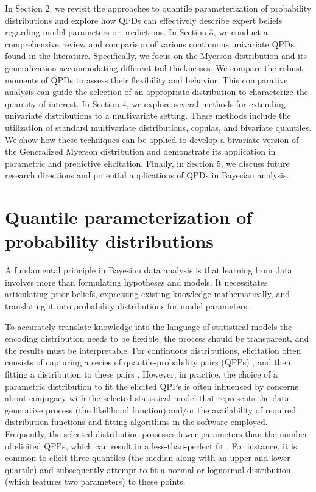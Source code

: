 \documentclass[
  fleqn,
  deca,
  blindrev
]{informs4}
\begin{document}
In Section 2, we revisit the approaches to quantile parameterization of
probability distributions and explore how QPDs can effectively describe
expert beliefs regarding model parameters or predictions. In Section 3,
we conduct a comprehensive review and comparison of various continuous
univariate QPDs found in the literature. Specifically, we focus on the
Myerson distribution and its generalization accommodating different tail
thicknesses. We compare the robust moments of QPDs to assess their
flexibility and behavior. This comparative analysis can guide the
selection of an appropriate distribution to characterize the quantity of
interest. In Section 4, we explore several methods for extending
univariate distributions to a multivariate setting. These methods
include the utilization of standard multivariate distributions, copulas,
and bivariate quantiles. We show how these techniques can be applied to
develop a bivariate version of the Generalized Myerson distribution and
demonstrate its application in parametric and predictive elicitation.
Finally, in Section 5, we discuss future research directions and
potential applications of QPDs in Bayesian analysis.

\section{Quantile parameterization of probability
distributions}\label{quantile-parameterization-of-probability-distributions}

A fundamental principle in Bayesian data analysis is that learning from
data involves more than formulating hypotheses and models. It
necessitates articulating prior beliefs, expressing existing knowledge
mathematically, and translating it into probability distributions for
model parameters.

To accurately translate knowledge into the language of statistical
models the encoding distribution needs to be flexible, the process
should be transparent, and the results must be interpretable. For
continuous distributions, elicitation often consists of capturing a
series of quantile-probability pairs (QPPs)
\citep{kadane1998ExperiencesElicitation, morgan2014UseAbuseExpert}, and
then fitting a distribution to these pairs
\citep{ohagan2019ExpertKnowledgeElicitation}. However, in practice, the
choice of a parametric distribution to fit the elicited QPPs is often
influenced by concerns about conjugacy with the selected statistical
model that represents the data-generative process (the likelihood
function) and/or the availability of required distribution functions and
fitting algorithms in the software employed. Frequently, the selected
distribution possesses fewer parameters than the number of elicited
QPPs, which can result in a less-than-perfect fit
\citep{ohagan2019ExpertKnowledgeElicitation}. For instance, it is common
to elicit three quantiles (the median along with an upper and lower
quartile) and subsequently attempt to fit a normal or lognormal
distribution (which features two parameters) to these points.
\end{document}
